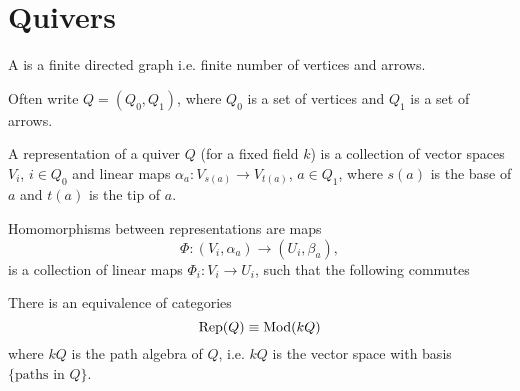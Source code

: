 \section{Quivers}

  \begin{define}
    A  is a finite directed graph i.e. finite number of vertices
    and arrows.
  \end{define}
  Often write $Q=(Q_0,Q_1)$, where $Q_0$ is a set of vertices and $Q_1$ is a
  set of arrows.

  \begin{define}
    A representation of a quiver $Q$ (for a fixed field $k$) is a collection of
    vector spaces $V_i$, $i\in Q_0$ and linear maps
    $\alpha_a:V_{s(a)} \to V_{t(a)}$, $a\in Q_1$, where $s(a)$ is the base of
    $a$ and $t(a)$ is the tip of $a$.
  \end{define}

  \begin{define}
    Homomorphisms between representations are maps
    \[ \Phi:(V_i, \alpha_a) \to (U_i, \beta_a),\]
    is a collection of linear maps $\Phi_i:V_i\to U_i$, such that the following
    commutes
    \begin{center}
  \end{center}
  \end{define}

  \begin{thm}
    There is an equivalence of categories
    \[ \operatorname{Rep}(Q) \equiv \operatorname{Mod}(kQ) \]
    where $kQ$ is the path algebra of $Q$, i.e. $kQ$ is the vector space with
    basis $\{\text{paths in }Q\}$.
  \end{thm}
